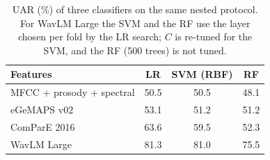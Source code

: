 \begin{table}[!t]
\centering
\caption{UAR (\%) of three classifiers on the same nested protocol. For WavLM Large the SVM and the RF use the layer chosen per fold by the LR search; $C$ is re-tuned for the SVM, and the RF (500 trees) is not tuned.}
\label{tab:classifiers}
\begin{tabular}{lccc}
\toprule
Features & LR & SVM (RBF) & RF \\
\midrule
MFCC + prosody + spectral & 50.5 & 50.5 & 48.1 \\
eGeMAPS v02 & 53.1 & 51.2 & 51.2 \\
ComParE 2016 & 63.6 & 59.5 & 52.3 \\
WavLM Large & 81.3 & 81.0 & 75.5 \\
\bottomrule
\end{tabular}
\end{table}
